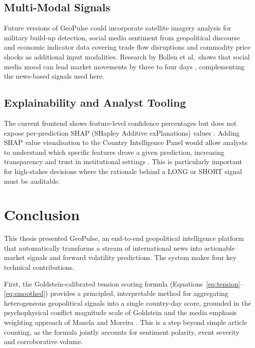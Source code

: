 \documentclass[12pt,a4paper]{report}
\begin{document}
\section{Multi-Modal Signals}

Future versions of GeoPulse could incorporate satellite imagery analysis
for military build-up detection, social media sentiment from geopolitical
discourse \cite{bollen2011} and economic indicator data covering trade
flow disruptions and commodity price shocks as additional input modalities.
Research by Bollen et al.\ shows that social media mood can lead market
movements by three to four days \cite{bollen2011}, complementing the
news-based signals used here.

\section{Explainability and Analyst Tooling}

The current frontend shows feature-level confidence percentages but does
not expose per-prediction SHAP (SHapley Additive exPlanations) values
\cite{ke2017}. Adding SHAP value visualisation to the Country Intelligence
Panel would allow analysts to understand which specific features drove a
given prediction, increasing transparency and trust in institutional
settings \cite{nassirtoussi2014}. This is particularly important for
high-stakes decisions where the rationale behind a LONG or SHORT signal
must be auditable.

\chapter{Conclusion}
\label{ch:conclusion}

This thesis presented GeoPulse, an end-to-end geopolitical
intelligence platform that automatically transforms a stream of
international news into actionable market signals and forward volatility
predictions. The system makes four key technical contributions.

First, the Goldstein-calibrated tension scoring formula
(Equations~\ref{eq:tension}--\ref{eq:smoothed}) provides a principled,
interpretable method for aggregating heterogeneous geopolitical signals
into a single country-day score, grounded in the psychophysical conflict
magnitude scale of Goldstein \cite{goldstein1992} and the media emphasis
weighting approach of Manela and Moreira \cite{manela2017}. This is a
step beyond simple article counting, as the formula jointly accounts for
sentiment polarity, event severity and corroborative volume.
\end{document}
